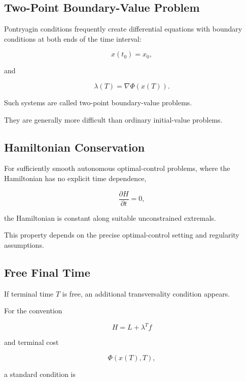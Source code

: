 \subsection{Two-Point Boundary-Value Problem}
\label{subsec:two-point-boundary-value}

Pontryagin conditions frequently create differential equations with
boundary conditions at both ends of the time interval:

\[
\boxed{
x(t_0)=x_0,
}
\]

and

\[
\boxed{
\lambda(T)
=
\nabla\Phi(x(T)).
}
\]

Such systems are called two-point boundary-value problems.

They are generally more difficult than ordinary initial-value problems.

\subsection{Hamiltonian Conservation}
\label{subsec:hamiltonian-conservation}

For sufficiently smooth autonomous optimal-control problems, where the
Hamiltonian has no explicit time dependence,

\[
\boxed{
\frac{\partial H}{\partial t}=0,
}
\]

the Hamiltonian is constant along suitable unconstrained extremals.

This property depends on the precise optimal-control setting and
regularity assumptions.

\subsection{Free Final Time}
\label{subsec:free-final-time}

If terminal time \(T\) is free, an additional transversality condition
appears.

For the convention

\[
H=L+\lambda^Tf
\]

and terminal cost

\[
\Phi(x(T),T),
\]

a standard condition is

